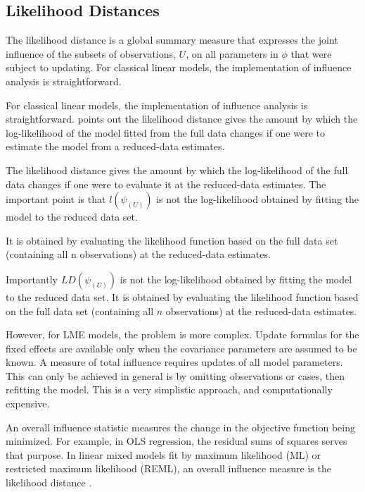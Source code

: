 \documentclass[12pt, a4paper]{report}
\theoremstyle{plain}
\theoremstyle{definition}
\theoremstyle{remark}
\begin{document}
	

	\subsection{Likelihood Distances}
	
	The  likelihood distance is a global summary measure that expresses the joint influence of the subsets of observations, $U$, on all parameters in $\phi$ that were subject to updating. For classical linear models, the implementation of influence analysis is straightforward.
	
	
	For classical linear models, the implementation of influence analysis is straightforward. \citet{schabenberger} points out the likelihood distance gives the amount by which the log-likelihood of the model fitted from the full data changes if one were
	to estimate the model from a reduced-data estimates.
	
	The likelihood distance gives the amount by which the log-likelihood of the full data changes if one were to evaluate it at the reduced-data estimates. The important point is that $l(\psi_{(U)})$ is not the log-likelihood obtained by fitting the model to the reduced data set.
	
	It is obtained by evaluating the likelihood function based on the full data set (containing all n observations) at the reduced-data estimates.
	
	
	
	
	Importantly $LD(\psi_{(U)})$ is not the log-likelihood obtained by fitting the model to the reduced data set. It is obtained by evaluating the likelihood function based on the full data set (containing all $n$ observations) at the reduced-data estimates.
	
	
	However, for LME models, the problem is more complex. Update formulas for the fixed effects are available only when the covariance parameters are assumed to be known. A measure of total influence requires updates of all model parameters. This can only be achieved in general is by omitting observations or cases, then refitting the model. This is a very simplistic approach, and computationally expensive.
	
	
	
	An overall influence statistic measures the change in the objective function being minimized. For example, in
	OLS regression, the residual sums of squares serves that purpose. In linear mixed models fit by
	 maximum likelihood (ML) or  restricted maximum likelihood (REML), an overall influence measure is the  likelihood distance \citep{cook}.
	
\end{document}
